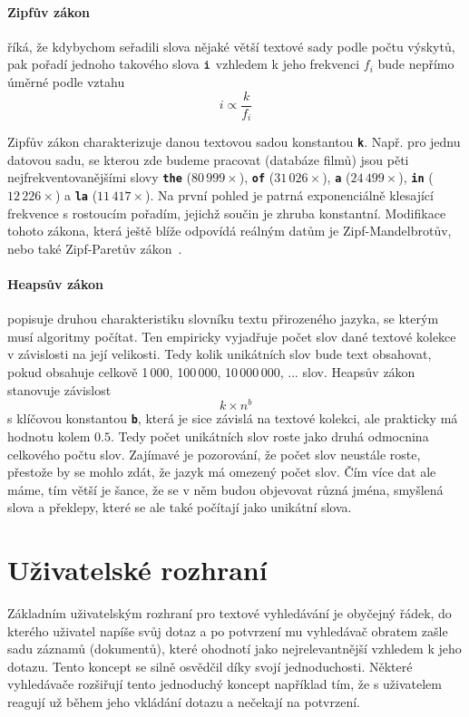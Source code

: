 \documentclass[11pt,letterpaper,oneside,openright]{book}
\newcommand{\bftt}[1]{\texttt{\textbf{#1}}}
\begin{document}
\paragraph{Zipfův zákon} říká, že kdybychom seřadili slova nějaké větší textové
sady podle počtu výskytů, pak pořadí jednoho takového slova $\bftt{i}$ vzhledem
k jeho frekvenci $f_i$ bude nepřímo úměrné podle vztahu \[i \propto \frac{k}{f_i}\]

Zipfův zákon charakterizuje danou textovou sadou konstantou
\bftt{k}. Např. pro jednu datovou sadu, se kterou zde budeme pracovat (databáze
filmů) jsou pěti nejfrekventovanějšími slovy \bftt{the} ($80\,999\times$),
\bftt{of} ($31\,026\times$), \bftt{a} ($24\,499\times$), \bftt{in} ($12\,226
\times$) a \bftt{la} ($11\,417\times$). Na první pohled je patrná exponenciálně
klesající frekvence s rostoucím pořadím, jejichž součin je zhruba konstantní.
Modifikace tohoto zákona, která ještě blíže odpovídá reálným datům je
Zipf-Mandelbrotův, nebo také Zipf-Paretův zákon~\cite{neumann_zipf}.

\paragraph{Heapsův zákon} popisuje druhou charakteristiku slovníku textu
přirozeného jazyka, se kterým musí algoritmy počítat. Ten empiricky vyjadřuje
počet slov dané textové kolekce v závislosti na její velikosti. Tedy kolik
unikátních slov bude text obsahovat, pokud obsahuje celkově 1\,000, 100\,000,
10\,000\,000, ... slov. Heapsův zákon stanovuje závislost \[k \times n^b\] s
klíčovou konstantou \bftt{b}, která je sice závislá na textové kolekci, ale
prakticky má hodnotu kolem $0.5$. Tedy počet unikátních slov roste jako druhá
odmocnina celkového počtu slov. Zajímavé je pozorování, že počet slov neustále
roste, přestože by se mohlo zdát, že jazyk má omezený počet slov. Čím více dat
ale máme, tím větší je šance, že se v něm budou objevovat různá jména, smyšlená
slova a překlepy, které se ale také počítají jako unikátní slova.

\section{Uživatelské rozhraní} \label{sec:uzivatelske_rozhrani}
Základním uživatelským rozhraní pro textové vyhledávání je obyčejný řádek, do
kterého uživatel napíše svůj dotaz a po potvrzení mu vyhledávač obratem zašle
sadu záznamů (dokumentů), které ohodnotí jako nejrelevantnější vzhledem k jeho
dotazu.  Tento koncept se silně osvědčil díky svojí jednoduchosti. Některé
vyhledávače rozšiřují tento jednoduchý koncept například tím, že s uživatelem
reagují už během jeho vkládání dotazu a nečekají na potvrzení.
\end{document}
